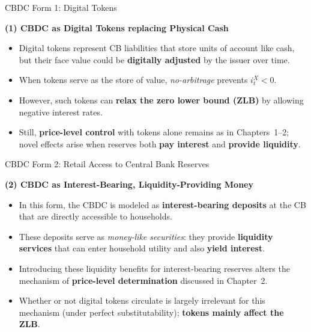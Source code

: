 \documentclass[11pt,aspectratio=169]{beamer}
\begin{document}
\begin{frame}{CBDC Form 1: Digital Tokens}
\small

\textbf{(1) CBDC as Digital Tokens replacing Physical Cash}
\begin{itemize}
  \item Digital tokens represent CB liabilities that store units of account like cash, but their face value could be \textbf{digitally adjusted} by the issuer over time.  
  \item When tokens serve as the store of value, \emph{no-arbitrage} prevents $i_t^X < 0$.
  \item However, such tokens can \textbf{relax the zero lower bound (ZLB)} by allowing negative interest rates.
  \item Still, \textbf{price-level control} with tokens alone remains as in Chapters~1–2; novel effects arise when reserves both \textbf{pay interest} and \textbf{provide liquidity}.
\end{itemize}
\end{frame}


\begin{frame}{CBDC Form 2: Retail Access to Central Bank Reserves}
\small

\textbf{(2) CBDC as Interest-Bearing, Liquidity-Providing Money}
\begin{itemize}
  \item In this form, the CBDC is modeled as \textbf{interest-bearing deposits} at the CB that are directly accessible to households.
  \item These deposits serve as \emph{money-like securities}: they provide \textbf{liquidity services} that can enter household utility and also \textbf{yield interest}.
  \item Introducing these liquidity benefits for interest-bearing reserves alters the mechanism of \textbf{price-level determination} discussed in Chapter~2.
  \item Whether or not digital tokens circulate is largely irrelevant for this mechanism (under perfect substitutability); \textbf{tokens mainly affect the ZLB}.
\end{itemize}
\end{frame}
\end{document}
